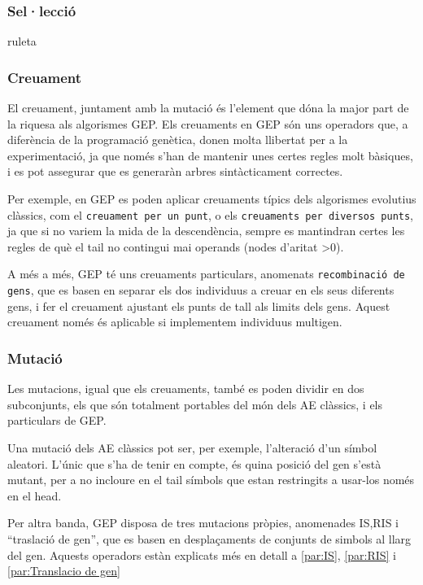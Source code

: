 \subsubsection{Sel·lecció} %
\label{ssub:Seleccio}
ruleta


\subsubsection{Creuament} %
\label{ssub:Creuament}

El creuament, juntament amb la mutació és l'element que dóna la major part de la
riquesa als algorismes GEP.  Els creuaments en GEP són uns operadors que, a
diferència de la programació genètica, donen molta llibertat per a la
experimentació, ja que només s'han de mantenir unes certes regles molt bàsiques,
i es pot assegurar que es generaràn arbres sintàcticament correctes.

Per exemple, en GEP es poden aplicar creuaments típics dels algorismes evolutius
clàssics, com el \texttt{creuament per un punt}, o els \texttt{creuaments per
diversos punts}, ja que si no variem la mida de la descendència, sempre es
mantindran certes les regles de què el tail no contingui mai operands (nodes
d'aritat >0).

A més a més, GEP té uns creuaments particulars, anomenats \texttt{recombinació
de gens}, que es basen en separar els dos individuus a creuar en els seus
diferents gens, i fer el creuament ajustant els punts de tall als limits dels
gens.  Aquest creuament només és aplicable si implementem individuus multigen.

\subsubsection{Mutació} %
\label{ssub:Mutacio}
Les mutacions, igual que els creuaments, també es poden dividir en dos
subconjunts, els que són totalment portables del món dels AE clàssics, i els
particulars de GEP.

Una mutació dels AE clàssics pot ser, per exemple, l'alteració d'un símbol
aleatori.  L'únic que s'ha de tenir en compte, és quina posició del gen s'està
mutant, per a no incloure en el tail símbols que estan restringits a usar-los
només en el head.

Per altra banda, GEP disposa de tres mutacions pròpies, anomenades IS,RIS i
``traslació de gen'', que es basen en desplaçaments de conjunts de simbols al
llarg del gen.  Aquests operadors estàn explicats més en detall a \ref{par:IS},
\ref{par:RIS} i \ref{par:Translacio de gen}

